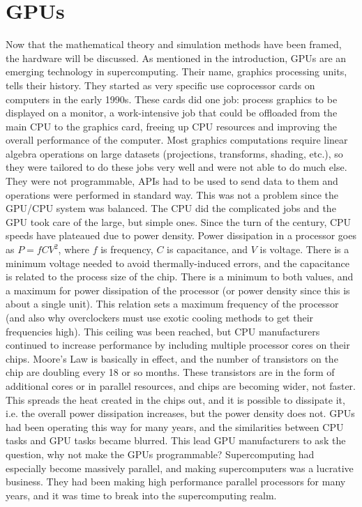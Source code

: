 
\section{GPUs}

Now that the mathematical theory and simulation methods have been framed, the hardware will be discussed.  As mentioned in the introduction, GPUs are an emerging technology in supercomputing.  Their name, graphics processing units, tells their history.  They started as very specific use coprocessor cards on computers in the early 1990s.  These cards did one job:  process graphics to be displayed on a monitor, a work-intensive job that could be offloaded from the main CPU to the graphics card, freeing up CPU resources and improving the overall performance of the computer.  Most graphics computations require linear algebra operations on large datasets (projections, transforms, shading, etc.), so they were tailored to do these jobs very well and were not able to do much else.  They were not programmable, APIs had to be used to send data to them and operations were performed in standard way.  This was not a problem since the GPU/CPU system was balanced.  The CPU did the complicated jobs and the GPU took care of the large, but simple ones.  Since the turn of the century, CPU speeds have plateaued due to power density.  Power dissipation in a processor goes as $P=fCV^2$, where $f$ is frequency, $C$ is capacitance, and $V$ is voltage.  There is a minimum voltage needed to avoid thermally-induced errors, and the capacitance is related to the process size of the chip.  There is a minimum to both values, and a maximum for power dissipation of the processor (or power density since this is about a single unit).  This relation sets a maximum frequency of the processor (and also why overclockers must use exotic cooling methods to get their frequencies high).  This ceiling was been reached, but CPU manufacturers continued to increase performance by including multiple processor cores on their chips.  Moore's Law is basically in effect, and the number of transistors on the chip are doubling every 18 or so months.  These transistors are in the form of additional cores or in parallel resources, and chips are becoming wider, not faster.  This spreads the heat created in the chips out, and it is possible to dissipate it, i.e. the overall power dissipation increases, but the power density does not.  GPUs had been operating this way for many years, and the similarities between CPU tasks and GPU tasks became blurred.  This lead GPU manufacturers to ask the question, why not make the GPUs programmable?  Supercomputing had especially become massively parallel, and making supercomputers was a lucrative business.  They had been making high performance parallel processors for many years, and it was time to break into the supercomputing realm.

